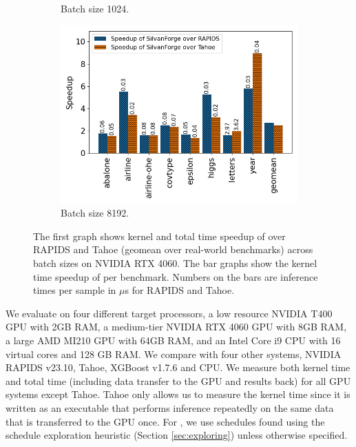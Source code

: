 \begin{figure}[htb]
\begin{subfigure}[t]{.32\linewidth}
    \caption{\label{Fig:KernelTimeIndividualBenchmarks4060a} Batch size 1024.}
  \end{subfigure}
  \begin{subfigure}[t]{.32\linewidth}
    \includegraphics[width=\textwidth]{figures/speedup_bar_graph_8192.png}
    \caption{\label{Fig:KernelTimeIndividualBenchmarks4060b} Batch size 8192.}
  \end{subfigure}
  \caption{The first graph shows kernel and total time speedup of \Treebeard{} over RAPIDS and Tahoe (geomean over real-world 
  benchmarks) across batch sizes on NVIDIA RTX 4060. The bar graphs show the kernel time speedup of \Treebeard{} per benchmark. Numbers on the bars are inference times per sample in $\mu$s for RAPIDS and Tahoe.}
\end{figure}

We evaluate \Treebeard{} on four different target processors, a low resource NVIDIA T400 GPU with 2GB RAM, a medium-tier NVIDIA RTX 4060 GPU with 8GB RAM, a large AMD MI210 GPU with 64GB RAM, and an 
Intel Core i9 CPU  with 16 virtual cores and 128 GB RAM. We compare \Treebeard{} with 
four other systems, NVIDIA RAPIDS\cite{RAPIDS} v23.10, Tahoe\cite{Tahoe}, XGBoost\cite{XGBoost}
v1.7.6 and \TreebeardOLD{}\cite{Treebeard} CPU. 
We measure both kernel time and total time (including data transfer to the GPU and results back) 
for all GPU systems except Tahoe. Tahoe only allows us to measure the kernel time since it is written
as an executable that performs inference repeatedly on the same data that is transferred to the GPU once.
For \Treebeard{}, we use schedules found using the schedule exploration
heuristic (Section \ref{sec:exploring}) unless otherwise specified.

